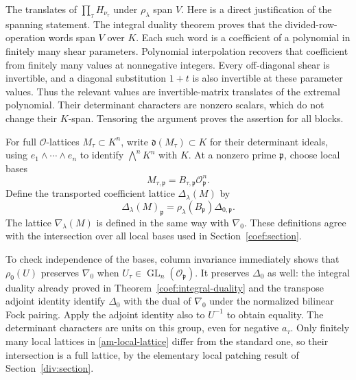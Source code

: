 The translates of $\prod_\tau H_{\nu_\tau}$ under $\rho_\lambda$ span
$V$. Here is a direct justification of the spanning statement. The
integral duality theorem proves that the divided-row-operation words
span $V$ over $K$. Each such word is a coefficient of a polynomial in
finitely many shear parameters. Polynomial interpolation recovers that
coefficient from finitely many values at nonnegative integers. Every
off-diagonal shear is invertible, and a diagonal substitution
$1+t$ is also invertible at these parameter values. Thus the relevant
values are invertible-matrix translates of the extremal polynomial.
Their determinant characters are nonzero scalars, which do not change
their $K$-span. Tensoring the argument proves the assertion for all blocks.

For full $\mathcal O$-lattices $M_\tau\subset K^n$, write
$\mathfrak d(M_\tau)\subset K$ for their determinant ideals, using
$e_1\wedge\cdots\wedge e_n$ to identify $\bigwedge^nK^n$ with $K$.
At a nonzero prime $\mathfrak p$, choose local bases
\[
       M_{\tau,\mathfrak p}=B_{\tau,\mathfrak p}\mathcal O_{\mathfrak p}^n.
\]
Define the transported coefficient lattice $\Delta_\lambda(M)$ by
\begin{equation}\label{am-local-lattice}
 \Delta_\lambda(M)_{\mathfrak p}
       =\rho_\lambda(B_{\mathfrak p})\Delta_{0,\mathfrak p}.
\end{equation}
The lattice $\nabla_\lambda(M)$ is defined in the same way with
$\nabla_0$. These definitions agree with the intersection over all
local bases used in Section~\ref{coef:section}.

To check independence of the bases, column invariance immediately
shows that $\rho_0(U)$ preserves $\nabla_0$ when
$U_\tau\in\operatorname{GL}_n(\mathcal O_{\mathfrak p})$.
It preserves $\Delta_0$ as well: the integral duality already proved in
Theorem~\ref{coef:integral-duality} and the transpose adjoint identity
identify $\Delta_0$ with the dual of $\nabla_0$ under the normalized
bilinear Fock pairing. Apply the adjoint identity also to $U^{-1}$ to
obtain equality. The determinant characters are units on this group,
even for negative $a_\tau$. Only finitely many local lattices in
\eqref{am-local-lattice} differ from the standard one, so their
intersection is a full lattice, by the elementary local patching result
of Section~\ref{div:section}.

